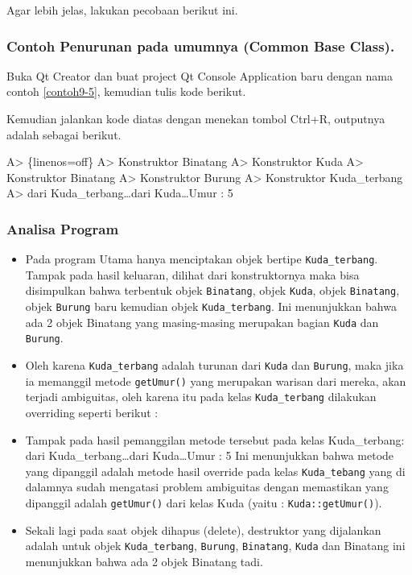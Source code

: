 

Agar lebih jelas, lakukan pecobaan berikut ini.

\subsubsection*{Contoh  Penurunan pada umumnya (Common Base Class).}

Buka Qt Creator dan buat project Qt Console Application baru dengan nama
contoh \ref{contoh9-5}, kemudian tulis kode berikut.





Kemudian jalankan kode diatas dengan menekan tombol Ctrl+R, outputnya
adalah sebagai berikut.

A\textgreater{} \{linenos=off\} A\textgreater{} Konstruktor Binatang
A\textgreater{} Konstruktor Kuda A\textgreater{} Konstruktor Binatang
A\textgreater{} Konstruktor Burung A\textgreater{} Konstruktor
Kuda\_terbang A\textgreater{} dari Kuda\_terbang\ldots{}dari
Kuda\ldots{}Umur : 5

\subsubsection*{Analisa Program}

\begin{itemize}
\item
  Pada program Utama hanya menciptakan objek bertipe
  \texttt{Kuda\_terbang}. Tampak pada hasil keluaran, dilihat dari
  konstruktornya maka bisa disimpulkan bahwa terbentuk objek
  \texttt{Binatang}, objek \texttt{Kuda}, objek \texttt{Binatang}, objek
  \texttt{Burung} baru kemudian objek \texttt{Kuda\_terbang}. Ini
  menunjukkan bahwa ada 2 objek Binatang yang masing-masing merupakan
  bagian \texttt{Kuda} dan \texttt{Burung}.
\item
  Oleh karena \texttt{Kuda\_terbang} adalah turunan dari \texttt{Kuda}
  dan \texttt{Burung}, maka jika ia memanggil metode \texttt{getUmur()}
  yang merupakan warisan dari mereka, akan terjadi ambiguitas, oleh
  karena itu pada kelas \texttt{Kuda\_terbang} dilakukan overriding
  seperti berikut :


\item
  Tampak pada hasil pemanggilan metode tersebut pada kelas
  Kuda\_terbang: dari Kuda\_terbang\ldots{}dari Kuda\ldots{}Umur : 5 Ini
  menunjukkan bahwa metode yang dipanggil adalah metode hasil override
  pada kelas \texttt{Kuda\_tebang} yang di dalamnya sudah mengatasi
  problem ambiguitas dengan memastikan yang dipanggil adalah
  \texttt{getUmur()} dari kelas Kuda (yaitu : \texttt{Kuda::getUmur()}).
\item
  Sekali lagi pada saat objek dihapus (delete), destruktor yang
  dijalankan adalah untuk objek \texttt{Kuda\_terbang}, \texttt{Burung},
  \texttt{Binatang}, \texttt{Kuda} dan Binatang ini menunjukkan bahwa
  ada 2 objek Binatang tadi.
\end{itemize}

